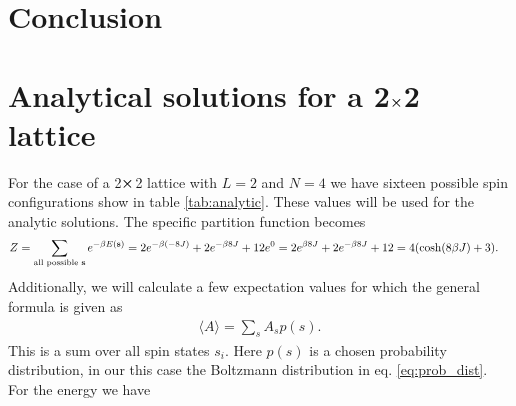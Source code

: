 \documentclass[english,notitlepage,reprint,nofootinbib]{revtex4-1}  %
\begin{document}
\section{Conclusion}\label{sec:conclusion}



\onecolumngrid

%


\newpage
\appendix
\raggedbottom

\section{Analytical solutions for a 2$\cross$2 lattice}\label{appendix:analytic}
For the case of a 2$\cross$2 lattice with $L=2$ and $N=4$ we have sixteen possible spin configurations show in table \ref{tab:analytic}. These values will be used for the analytic solutions. The specific partition function becomes
\begin{align*}
    Z &=  \sum_{\text{all possible \textbf{s}}} e^{- \beta E(\textbf{s})} 
    = 2e^{- \beta (-8J)} + 2e^{- \beta 8J} + 12e^0 
    = 2 e^{\beta 8J} + 2 e^{- \beta 8J} + 12 
    = 4 (\cosh(8 \beta J) + 3).
\end{align*}
Additionally, we will calculate a few expectation values for which the general formula is given as
\begin{align*}
    \langle A \rangle = \sum_s A_s p(s).
\end{align*}
This is a sum over all spin states $s_i$. Here $p(s)$ is a chosen probability distribution, in our this case the Boltzmann distribution in eq. \ref{eq:prob_dist}. For the energy we have
\end{document}
